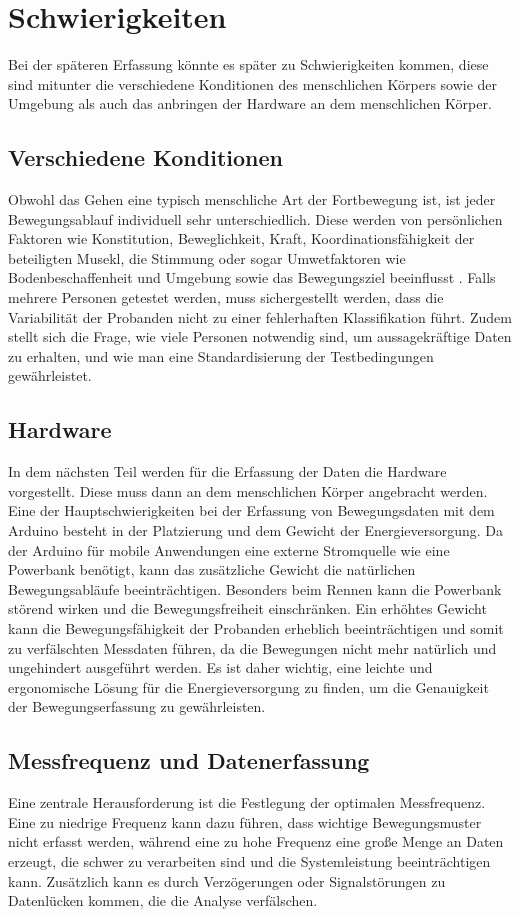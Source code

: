 \chapter{Schwierigkeiten}
Bei der späteren Erfassung könnte es später zu Schwierigkeiten kommen, diese sind mitunter die verschiedene Konditionen des menschlichen Körpers sowie der Umgebung als auch das anbringen der Hardware an dem menschlichen Körper.

\section{Verschiedene Konditionen}
Obwohl das Gehen eine typisch menschliche Art der Fortbewegung ist, ist jeder Bewegungsablauf individuell sehr unterschiedlich. Diese werden von persönlichen Faktoren wie Konstitution, Beweglichkeit, Kraft, Koordinationsfähigkeit der beteiligten Musekl, die Stimmung oder sogar Umwetfaktoren wie Bodenbeschaffenheit und Umgebung sowie das Bewegungsziel beeinflusst \cite{suppe2013fbl}. Falls mehrere Personen getestet werden, muss sichergestellt werden, dass die Variabilität der Probanden nicht zu einer fehlerhaften Klassifikation führt. Zudem stellt sich die Frage, wie viele Personen notwendig sind, um aussagekräftige Daten zu erhalten, und wie man eine Standardisierung der Testbedingungen gewährleistet.

\section{Hardware}
In dem nächsten Teil werden für die Erfassung der Daten die Hardware vorgestellt. Diese muss dann an dem menschlichen Körper angebracht werden. Eine der Hauptschwierigkeiten bei der Erfassung von Bewegungsdaten mit dem Arduino besteht in der Platzierung und dem Gewicht der Energieversorgung. Da der Arduino für mobile Anwendungen eine externe Stromquelle wie eine Powerbank benötigt, kann das zusätzliche Gewicht die natürlichen Bewegungsabläufe beeinträchtigen. Besonders beim Rennen kann die Powerbank störend wirken und die Bewegungsfreiheit einschränken. Ein erhöhtes Gewicht kann die Bewegungsfähigkeit der Probanden erheblich beeinträchtigen \cite{monfrini2023technological} und somit zu verfälschten Messdaten führen, da die Bewegungen nicht mehr natürlich und ungehindert ausgeführt werden. Es ist daher wichtig, eine leichte und ergonomische Lösung für die Energieversorgung zu finden, um die Genauigkeit der Bewegungserfassung zu gewährleisten.

\section{Messfrequenz und Datenerfassung}
Eine zentrale Herausforderung ist die Festlegung der optimalen Messfrequenz. Eine zu niedrige Frequenz kann dazu führen, dass wichtige Bewegungsmuster nicht erfasst werden, während eine zu hohe Frequenz eine große Menge an Daten erzeugt, die schwer zu verarbeiten sind und die Systemleistung beeinträchtigen kann. Zusätzlich kann es durch Verzögerungen oder Signalstörungen zu Datenlücken kommen, die die Analyse verfälschen.